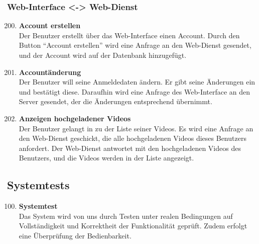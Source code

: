\subsubsection{\gls{Web-Interface} <-> \gls{Web-Dienst}}
\begin{enumerate}[\bfseries{TI}10]  
\setcounter{enumi}{199}{}

\item \textbf{Account erstellen} \hfill\\
Der Benutzer erstellt \"uber das \gls{Web-Interface} einen Account. Durch den Button ``Account erstellen'' wird eine Anfrage an den \gls{Web-Dienst} gesendet, und der Account wird auf der Datenbank hinzugef\"ugt.

\item \textbf{Account\"anderung} \hfill\\
Der Benutzer will seine Anmeldedaten \"andern. Er gibt seine Änderungen ein und best\"atigt diese. Daraufhin wird eine Anfrage des \gls{Web-Interface} an den Server gesendet, der die Änderungen entsprechend übernimmt.

\item \textbf{Anzeigen hochgeladener Videos} \hfill\\
Der Benutzer gelangt in zu der Liste seiner Videos. Es wird  eine Anfrage an den \gls{Web-Dienst} geschickt, die alle hochgeladenen Videos dieses Benutzers anfordert. Der Web-Dienst antwortet mit den hochgeladenen Videos des Benutzers, und die Videos werden in der Liste angezeigt. 

\end{enumerate}

\subsection{Systemtests}
\begin{enumerate}[\bfseries{TS}10]  
\setcounter{enumi}{99}{}

\item \textbf{Systemtest} \hfill\\  
Das System wird von uns durch Testen unter realen Bedingungen auf Vollständigkeit und Korrektheit der Funktionalität geprüft. Zudem erfolgt eine Überprüfung der Bedienbarkeit. 
\end{enumerate}